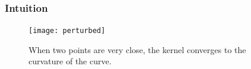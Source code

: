 \documentclass{beamer}
\theoremstyle{remark}
\newcommand{\gammabf}{\boldsymbol{\gamma}}
\begin{document}
\begin{frame}
    \frametitle{Intuition}
    \begin{figure}[h]
        \centering
        \texttt{[image: perturbed]}
        \caption{When two points are very close, the kernel converges to the curvature of the curve.}
    \end{figure}
\end{frame}

%
\end{document}
